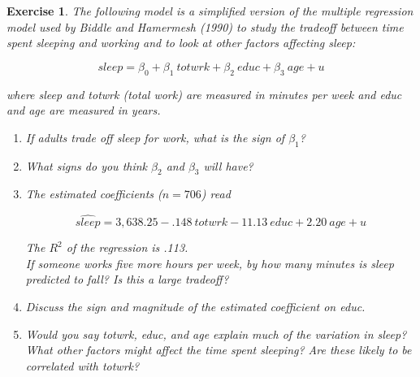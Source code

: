\documentclass{article}
\newtheorem{exercise}[theorem]{Exercise}
\begin{document}
\begin{exercise} %
The following model is a simplified version of the multiple regression model used by Biddle and Hamermesh (1990) to study the tradeoff between time spent sleeping and working and to look at other factors affecting sleep:

\begin{equation*}
    sleep = \beta_0 +\beta_1~totwrk +\beta_2~educ+\beta_3~age +u
\end{equation*}

where sleep and totwrk (total work) are measured in minutes per week and educ and age are measured in years.

\begin{enumerate}[label=(\alph*)]
    \item If adults trade off sleep for work, what is the sign of $\beta_1$?
    \item What signs do you think $\beta_2$ and $\beta_3$ will have?
    \item The estimated coefficients ($n=706$) read

    \begin{equation*}
    \widehat{sleep} = 3,638.25 -.148~totwrk - 11.13~educ+2.20~age +u
\end{equation*}

The $R^2$ of the regression is .113.\\

If someone works five more hours per week, by how many minutes is sleep predicted to fall? Is this a large tradeoff?
    \item Discuss the sign and magnitude of the estimated coefficient on educ.
    \item Would you say totwrk, educ, and age explain much of the variation in sleep? What other factors might affect the time spent sleeping? Are these likely to be correlated with totwrk?
\end{enumerate}
\end{exercise}
\end{document}
